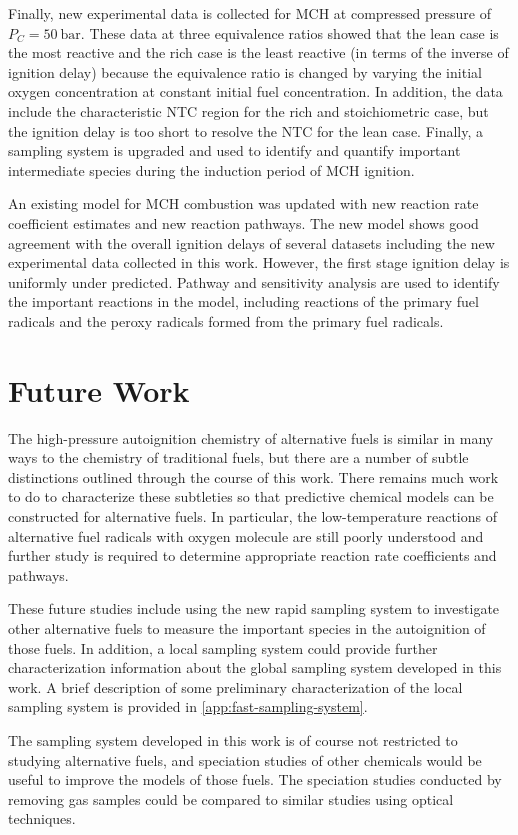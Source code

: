 \documentclass[../main.tex]{subfiles}
\begin{document}
Finally, new experimental data is collected for MCH at compressed
pressure of $P_C=\SI{50}{\bar}$. These data at three equivalence ratios
showed that the lean case is the most reactive and the rich case is the
least reactive (in terms of the inverse of ignition delay) because the
equivalence ratio is changed by varying the initial oxygen concentration
at constant initial fuel concentration. In addition, the data include the
characteristic NTC region for the rich and stoichiometric case, but the
ignition delay is too short to resolve the NTC for the lean case. Finally,
a sampling system is upgraded and used to identify and quantify important intermediate
species during the induction period of MCH ignition.

An existing model for MCH combustion was updated with new reaction rate
coefficient estimates and new reaction pathways. The new model shows
good agreement with the overall ignition delays of several datasets
including the new experimental data collected in this work. However,
the first stage ignition delay is uniformly under predicted. Pathway
and sensitivity analysis are used to identify the important reactions in
the model, including reactions of the primary fuel radicals and the peroxy
radicals formed from the primary fuel radicals.

\section{Future Work}
\label{sec:future-work}

The high-pressure autoignition chemistry of alternative fuels is similar
in many ways to the chemistry of traditional fuels, but there are a
number of subtle distinctions outlined through the course of this work.
There remains much work to do to characterize these subtleties so that
predictive chemical models can be constructed for alternative fuels. In
particular, the low-temperature reactions of alternative fuel radicals
with oxygen molecule are still poorly understood and further study is
required to determine appropriate reaction rate coefficients and pathways.

These future studies include using the new rapid sampling system to
investigate other alternative fuels to measure the important species
in the autoignition of those fuels. In addition, a local sampling
system could provide further characterization information about the
global sampling system developed in this work. A brief description of
some preliminary characterization of the local sampling system is
provided in \cref{app:fast-sampling-system}.

The sampling system developed in this work is of course not restricted
to studying alternative fuels, and speciation studies of other chemicals
would be useful to improve the models of those fuels. The speciation
studies conducted by removing gas samples could be compared to similar
studies using optical techniques.
\end{document}

